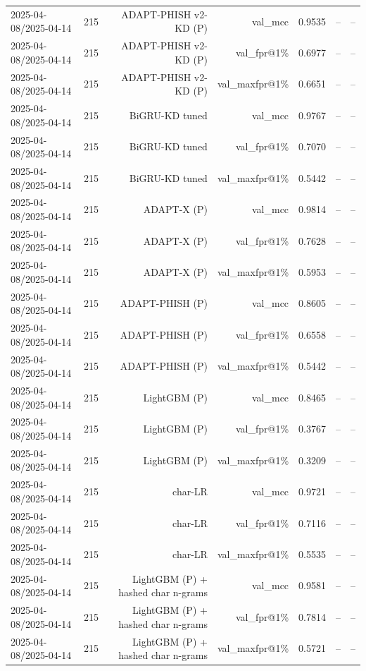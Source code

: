 \begin{table}[t]
\begin{tabular}{llrrrrr}
2025-04-08/2025-04-14 & 215 & ADAPT-PHISH v2-KD (P) & val\_mcc & 0.9535 & -- & -- \\
2025-04-08/2025-04-14 & 215 & ADAPT-PHISH v2-KD (P) & val\_fpr@1\% & 0.6977 & -- & -- \\
2025-04-08/2025-04-14 & 215 & ADAPT-PHISH v2-KD (P) & val\_maxfpr@1\% & 0.6651 & -- & -- \\
2025-04-08/2025-04-14 & 215 & BiGRU-KD tuned & val\_mcc & 0.9767 & -- & -- \\
2025-04-08/2025-04-14 & 215 & BiGRU-KD tuned & val\_fpr@1\% & 0.7070 & -- & -- \\
2025-04-08/2025-04-14 & 215 & BiGRU-KD tuned & val\_maxfpr@1\% & 0.5442 & -- & -- \\
2025-04-08/2025-04-14 & 215 & ADAPT-X (P) & val\_mcc & 0.9814 & -- & -- \\
2025-04-08/2025-04-14 & 215 & ADAPT-X (P) & val\_fpr@1\% & 0.7628 & -- & -- \\
2025-04-08/2025-04-14 & 215 & ADAPT-X (P) & val\_maxfpr@1\% & 0.5953 & -- & -- \\
2025-04-08/2025-04-14 & 215 & ADAPT-PHISH (P) & val\_mcc & 0.8605 & -- & -- \\
2025-04-08/2025-04-14 & 215 & ADAPT-PHISH (P) & val\_fpr@1\% & 0.6558 & -- & -- \\
2025-04-08/2025-04-14 & 215 & ADAPT-PHISH (P) & val\_maxfpr@1\% & 0.5442 & -- & -- \\
2025-04-08/2025-04-14 & 215 & LightGBM (P) & val\_mcc & 0.8465 & -- & -- \\
2025-04-08/2025-04-14 & 215 & LightGBM (P) & val\_fpr@1\% & 0.3767 & -- & -- \\
2025-04-08/2025-04-14 & 215 & LightGBM (P) & val\_maxfpr@1\% & 0.3209 & -- & -- \\
2025-04-08/2025-04-14 & 215 & char-LR & val\_mcc & 0.9721 & -- & -- \\
2025-04-08/2025-04-14 & 215 & char-LR & val\_fpr@1\% & 0.7116 & -- & -- \\
2025-04-08/2025-04-14 & 215 & char-LR & val\_maxfpr@1\% & 0.5535 & -- & -- \\
2025-04-08/2025-04-14 & 215 & LightGBM (P) + hashed char n-grams & val\_mcc & 0.9581 & -- & -- \\
2025-04-08/2025-04-14 & 215 & LightGBM (P) + hashed char n-grams & val\_fpr@1\% & 0.7814 & -- & -- \\
2025-04-08/2025-04-14 & 215 & LightGBM (P) + hashed char n-grams & val\_maxfpr@1\% & 0.5721 & -- & -- \\

\end{tabular}
\end{table}
